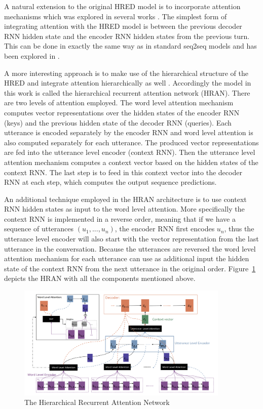 \documentclass[12pt]{article}
\begin{document}
A natural extension to the original HRED model is to incorporate attention mechanisms which was explored in several works \cite{Yao:2015,Yao:2016,Xing:2017}. The simplest form of integrating attention with the HRED model is between the previous decoder RNN hidden state and the encoder RNN hidden states from the previous turn. This can be done in exactly the same way as in standard seq2seq models and has been explored in \cite{Yao:2015,Yao:2016}.

A more interesting approach is to make use of the hierarchical structure of the HRED and integrate attention hierarchically as well \cite{Xing:2017}. Accordingly the model in this work is called the hierarchical recurrent attention network (HRAN). There are two levels of attention employed. The word level attention mechanism computes vector representations over the hidden states of the encoder RNN (keys) and the previous hidden state of the decoder RNN (queries). Each utterance is encoded separately by the encoder RNN and word level attention is also computed separately for each utterance. The produced vector representations are fed into the utterance level encoder (context RNN). Then the utterance level attention mechanism computes a context vector based on the hidden states of the context RNN. The last step is to feed in this context vector into the decoder RNN at each step, which computes the output sequence predictions. 

An additional technique employed in the HRAN architecture is to use context RNN hidden states as input to the word level attention. More specifically the context RNN is implemented in a reverse order, meaning that if we have a sequence of utterances \((u_1,...,u_n)\), the encoder RNN first encodes \(u_n\), thus the utterance level encoder will also start with the vector representation from the last utterance in the conversation. Because the utterances are reversed the word level attention mechanism for each utterance can use as additional input the hidden state of the context RNN from the next utterance in the original order. Figure~\ref{fig:HRAN} depicts the HRAN with all the components mentioned above.
\begin{figure}[H]
	\label{fig:HRAN}
	\centering
	\includegraphics[width=0.9\textwidth]{pics/hran.png}
	\caption{The Hierarchical Recurrent Attention Network \cite{Xing:2017}}
\end{figure}
\end{document}
